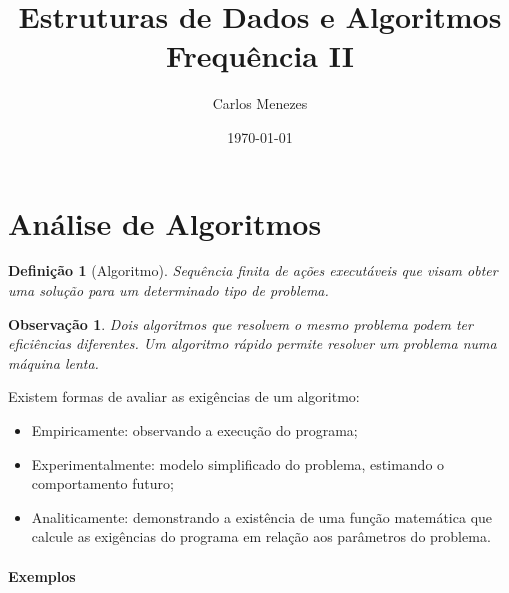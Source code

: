 \documentclass[a4paper, 12pt]{article}
\title{Estruturas de Dados e Algoritmos\\ \Large{Frequência II}}
\author{Carlos Menezes}
\date{\today}
\newtheorem{definition}{Definição}[section]
\newtheorem{remark}{Observação}
\begin{document}
\maketitle

\newpage

\tableofcontents

\newpage

\section{Análise de Algoritmos}

\begin{definition}[Algoritmo]
    Sequência finita de ações executáveis que visam obter uma solução para um determinado tipo de problema.
\end{definition}

\begin{remark}
    Dois algoritmos que resolvem o mesmo problema podem ter eficiências diferentes. Um algoritmo rápido permite resolver um problema numa máquina lenta.
\end{remark}

Existem formas de avaliar as exigências de um algoritmo:
\begin{itemize}
    \item Empiricamente: observando a execução do programa;
    \item Experimentalmente: modelo simplificado do problema, estimando o comportamento futuro;
    \item Analiticamente: demonstrando a existência de uma função matemática que calcule as exigências do programa em relação aos parâmetros do problema.
\end{itemize}

\paragraph{Exemplos} 
\end{document}
